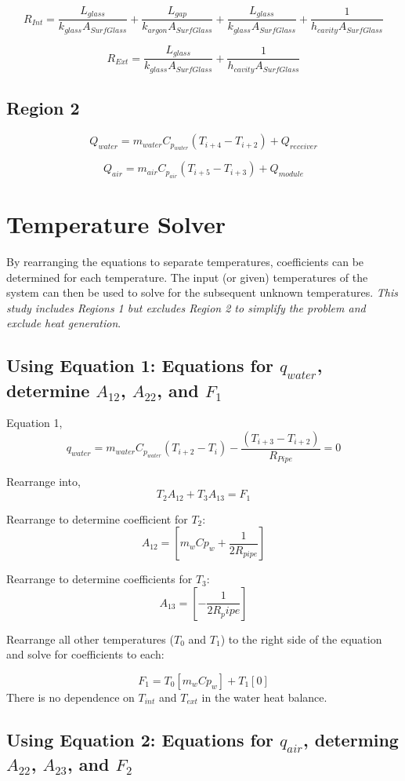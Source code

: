\documentclass[12pt]{report}
\begin{document}
$$ R_{Int} = \frac{L_{glass}}{k_{glass}  A_{SurfGlass}} 
	+ \frac{L_{gap}}{k_{argon}  A_{SurfGlass}} 
	+ \frac{L_{glass}}{k_{glass}  A_{SurfGlass}} + \frac{1}{h_{cavity} A_{SurfGlass}}$$
	
$$ R_{Ext} = \frac{L_{glass}}{k_{glass}  A_{SurfGlass}} + \frac{1}{h_{cavity} A_{SurfGlass}}$$

\subsection{Region 2}

$$ Q_{water} = m_{water} C_{p_{water}} (T_{i+4} - T_{i+2}) + Q_{receiver} $$

$$ Q_{air} = m_{air} C_{p_{air}} (T_{i+5} - T_{i+3}) + Q_{module} $$
        
\section{Temperature Solver}
By rearranging the equations to separate temperatures, coefficients can be determined for each temperature. The input (or given) temperatures of the system can then be used to solve for the subsequent unknown temperatures. \textit{This study includes Regions 1 but excludes Region 2 to simplify the problem and exclude heat generation}.

\subsection{Using Equation 1: Equations for $q_{water}$, determine $A_{12}$, $A_{22}$, and $F_1$}

Equation 1, 
$$q_{water} = m_{water} C_{p_{water}} (T_{i+2}-T_i) - 
	\frac
	{\left( 
		T_{i+3} - T_{i+2} 
		\right)}
	{R_{Pipe}}
	= 0 $$

Rearrange into,
$$ T_2 A_{12} + T_3 A_{13} = F_1 $$

Rearrange to determine coefficient for $T_2$:
$$ A_{12} = [m_w Cp_w + \frac{1}{2 R_{pipe}}] $$

Rearrange to determine coefficients for $T_3$:
$$ A_{13} = [- \frac{1}{2 R_pipe}] $$

Rearrange all other temperatures ($T_0$ and $T_1$) to the right side of the equation and solve for coefficients to each:

$$ F_1 = 
	T_0 [m_w Cp_w]
	+ T_1 [0]$$
There is no dependence on $T_{int}$ and $T_{ext}$ in the water heat balance.

\subsection{Using Equation 2: Equations for $q_{air}$, determing $A_{22}$, $A_{23}$, and $F_2$}
\end{document}
